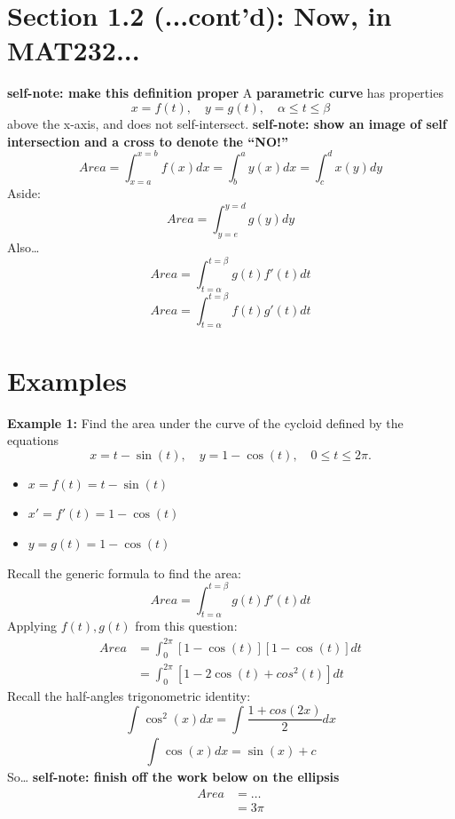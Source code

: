 \documentclass{article}
\begin{document}
\section*{Section 1.2 (...cont'd): Now, in MAT232...}
\begin{definitionbox}
    \textbf{self-note: make this definition proper}
    A \textbf{parametric curve} has properties
    \[
        x = f(t), \quad y = g(t), \quad \alpha \leq t \leq \beta
    \]
    above the x-axis, and does not self-intersect.
    \textbf{self-note: show an image of self intersection and a cross to denote the ``NO!''}
    \[
        Area = \int_{x=a}^{x=b} f(x) dx = \int_{b}^{a} y(x) dx = \int_{c}^{d} x(y) dy
    \]
    Aside:
    \[
        Area = \int_{y=e}^{y=d} g(y) dy
    \]
    Also\dots
    \[
        Area = \int_{t=\alpha}^{t=\beta} g(t) f'(t) dt
    \]
    \[
        Area = \int_{t=\alpha}^{t=\beta} f(t) g'(t) dt
    \]
\end{definitionbox}

\section*{Examples}
\begin{examplebox}
\textbf{Example 1:} Find the area under the curve of the cycloid defined by the equations
\[ x = t - \sin(t), \quad y = 1 - \cos(t), \quad 0 \leq t \leq 2\pi. \]
\begin{itemize}
    \item \( x = f(t) = t - \sin(t) \) 
    \item \( x' = f'(t) = 1 - \cos(t) \) 
    \item \( y = g(t) = 1 - \cos(t) \)
\end{itemize}
Recall the generic formula to find the area:
\[
    Area = \int_{t=\alpha}^{t=\beta} g(t) f'(t) dt
\]
Applying \( f(t), g(t) \) from this question:
\begin{equation*}
    \begin{aligned}
        Area &= \int_{0}^{2\pi} [1 - \cos(t)][1 - \cos(t)] dt \\
        &= \int_{0}^{2\pi} [1 - 2\cos(t) + cos^2(t)] dt
    \end{aligned}
\end{equation*}
Recall the half-angles trigonometric identity:
\[
    \int_{}^{} \cos^2(x) dx = \int_{}^{} \frac{1 + cos(2x)}{2} dx
\]
\[
    \int_{}^{} \cos(x) dx = \sin(x) + c
\]
So\dots
\textbf{self-note: finish off the work below on the ellipsis}
\begin{equation*}
    \begin{aligned}
        Area &= \dots \\
        &= 3\pi
    \end{aligned}
\end{equation*}
\end{examplebox}
\end{document}
